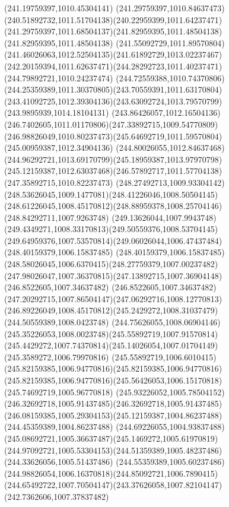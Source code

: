 {{\closepath
\moveto(241.19759397,1010.45304141)
\curveto(241.29759397,1010.84637473)(240.51892732,1011.51704138)(240.22959399,1011.64237471)
\curveto(241.29759397,1011.68504137)(241.82959395,1011.48504138)(241.82959395,1011.48504138)
\curveto(241.55092729,1011.89570804)(241.46026063,1012.52504135)(241.61892729,1013.02237467)
\curveto(242.20159394,1011.62637471)(244.28292723,1011.40237471)(244.79892721,1010.24237474)
\curveto(244.72559388,1010.74370806)(244.25359389,1011.30370805)(243.70559391,1011.63170804)
\curveto(243.41092725,1012.39304136)(243.63092724,1013.79570799)(243.9895939,1014.18104131)
\curveto(243.86426057,1012.16504136)(246.7402605,1011.01170806)(247.33892715,1009.54770809)
\curveto(246.98826049,1010.80237473)(245.64692719,1011.59570804)(245.00959387,1012.34904136)
\curveto(244.80026055,1012.84637468)(244.96292721,1013.69170799)(245.18959387,1013.97970798)
\curveto(245.12159387,1012.63037468)(246.57892717,1011.57704138)(247.35892715,1010.82237473)
\curveto(248.27492713,1009.93304142)(248.53626045,1009.1477081)(248.41226046,1008.50504145)
\curveto(248.61226045,1008.45170812)(248.88959378,1008.25704146)(248.84292711,1007.9263748)
\curveto(249.13626044,1007.9943748)(249.4349271,1008.33170813)(249.50559376,1008.53704145)
\curveto(249.64959376,1007.53570814)(249.06026044,1006.47437484)(248.40159379,1006.15837485)
\curveto(248.40159379,1006.15837485)(248.58026045,1006.6370415)(248.27759379,1007.00237482)
\curveto(247.98026047,1007.36370815)(247.13892715,1007.36904148)(246.8522605,1007.34637482)
\curveto(246.8522605,1007.34637482)(247.20292715,1007.86504147)(247.06292716,1008.12770813)
\curveto(246.89226049,1008.45170812)(245.2429272,1008.31037479)(244.50559389,1008.0423748)
\curveto(244.75626055,1008.06904146)(245.35226053,1008.0023748)(245.55892719,1007.91570814)
\curveto(245.4429272,1007.74370814)(245.14026054,1007.01704149)(245.3589272,1006.79970816)
\curveto(245.55892719,1006.6010415)(245.82159385,1006.94770816)(245.82159385,1006.94770816)
\curveto(245.82159385,1006.94770816)(245.56426053,1006.15170818)(245.74692719,1005.96770818)
\curveto(245.93226052,1005.78504152)(246.32692718,1005.91437485)(246.32692718,1005.91437485)
\curveto(246.08159385,1005.29304153)(245.12159387,1004.86237488)(244.45359389,1004.86237488)
\curveto(244.69226055,1004.93837488)(245.08692721,1005.36637487)(245.1469272,1005.61970819)
\curveto(244.97092721,1005.53304153)(244.51359389,1005.48237486)(244.33626056,1005.51437486)
\curveto(244.55359389,1005.60237486)(244.98826054,1006.16370818)(244.85092721,1006.7890415)
\curveto(244.65492722,1007.70504147)(243.37626058,1007.82104147)(242.7362606,1007.37837482)
}}

